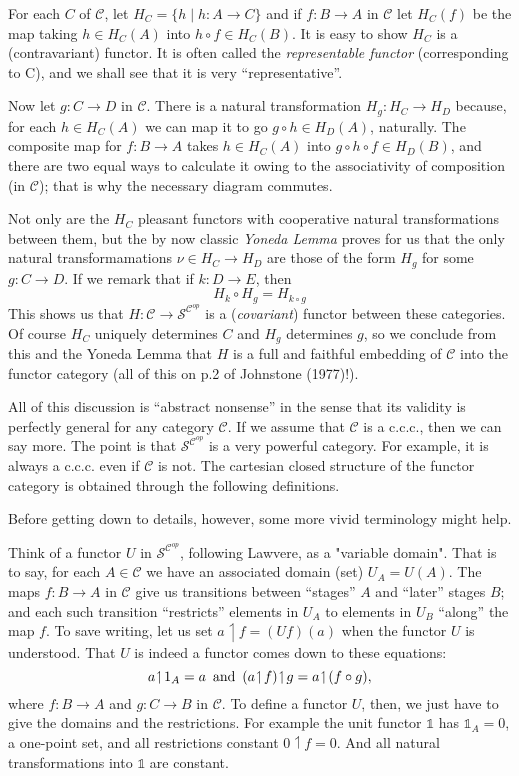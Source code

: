 \documentclass[12pt]{article}
\def\to{\rightarrow}
\def\id{{\textrm 1}}
\def\res{\!\upharpoonleft\!}
\def\comp{\circ}
\def\bbone{\mathbb 1}
\def\ccc{{c.c.c.}}
\def\C{\mathcal C}
\def\S{\mathcal S}
\def\scop{\S^{\C^{op}}}
\begin{document}
For each $C$ of $\C$, let $H_C = \{ h \mid h: A \to C \}$ and if $f: B\to A$ in $\C$ let $H_C(f)$ be the map taking $h \in H_C(A)$ into $h \comp f \in H_C(B)$.
It is easy to show $H_C$ is a (contravariant) functor. It is often called the {\it representable functor} (corresponding to C), and we shall see that it is very ``representative''.

Now let $g: C \to D$ in $\C$. There is a natural transformation
$H_g: H_C \to H_D$ because, for each $h \in H_C(A)$ we can map it to go $g \comp h \in H_D(A)$, naturally. The composite map for $f : B\to A$
takes $h \in H_C(A)$ into $g \comp h \comp f \in H_D(B)$, and there are two equal
ways to calculate it owing to the associativity of composition (in $\C$); that is why the necessary diagram commutes.

Not only are the $H_C$ pleasant functors with cooperative natural transformations between them, but the by now classic {\it Yoneda Lemma}
proves for us that the only natural transformamations $\nu \in H_C \to H_D$
are those of the form $H_g$ for some $g: C\to D$. If we remark that if $k:D\to E$, then
$$
H_k \comp H_g = H_{k \comp g}
$$
%
This shows us that $H : \C \to \S^{\C^{op}}$ is a ({\it covariant}) functor between these categories.
Of course $H_C$ uniquely determines $C$ and
$H_g$ determines $g$, so we conclude from this and the Yoneda Lemma that $H$ is a full and faithful embedding of $\C$ into the functor
category (all of this on p.2 of Johnstone (1977)!).

All of this discussion is ``abstract nonsense'' in the sense that its validity is perfectly general for any category $\C$. If we assume that $\C$ is a \ccc, then we can say more. The point is that $\scop$ is a very powerful category. For example, it is
always a c.c.c. even if $\C$ is not. The cartesian closed structure of the functor category is obtained through the following definitions.

Before getting down to details, however, some more vivid terminology might help.

Think of a functor $U$ in $\scop$, following Lawvere, as a "variable domain".  That is to say, for each $A \in \C$ we have an associated domain (set) $U_A = U(A)$. The maps $f:B \to A$ in $\C$ give us transitions between ``stages'' $A$ and ``later'' stages $B$; and each such transition ``restricts'' elements in
$U_A$ to elements in $U_B$ ``along'' the map $f$. To save writing, let us set $a \res f = (Uf)(a)$ when the functor $U$ is understood. That $U$ is indeed a functor comes down to these equations:
$$
a \res \id_A = a \,\textrm{ and }\, (a \res f) \res g = a \res (f \comp g),
$$
where  $f : B \to A$ and $g: C\to B$ in $\C$. To define a functor $U$, then, we just have to give the domains and the restrictions.
For example the unit functor $\bbone$ has $\bbone_A = {0}$, a one-point set, and all restrictions constant $0 \res f = 0$. And all natural transformations into $\bbone$ are constant.
\end{document}
